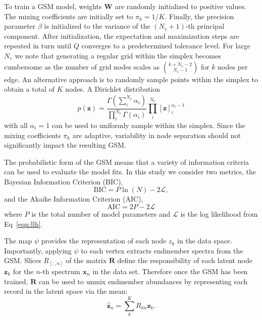 To train a GSM model, weights $\mathbf{W}$ are randomly initialized to positive
values. The mixing coefficients are initially set to $\pi_k = 1/K$. Finally, the
precision parameter $\beta$ is initialized to the variance of the $(N_v+1)$-th
principal component. After initialization, the expectation and maximization
steps are repeated in turn until $Q$ converges to a predetermined tolerance
level. For large $N_v$ we note that generating a regular grid within the simplex
becomes cumbersome as the number of grid nodes scales as ${k + N_v - 2 \choose
  N_v - 1}$ for $k$ nodes per edge. An alternative approach is to randomly
sample points within the simplex to obtain a total of $K$ nodes. A Dirichlet
distribution
\begin{equation}
    p(\mathbf{z}) = \frac{\Gamma(\sum_i^{N_v}\alpha_i)}{\prod_{i}^{N_v}\Gamma(\alpha_i)} \prod_{i}^{N_v} [\mathbf{z}]_i^{\alpha_i-1}
\end{equation}
with all $\alpha_i=1$ can be used to uniformly sample within the simplex. Since
the mixing coefficients $\pi_k$ are adaptive, variability in node separation
should not significantly impact the resulting GSM.

The probabilistic form of the GSM means that a variety of information criteria
can be used to evaluate the model fits. In this study we consider two metrics,
the Bayesian Information Criterion (BIC),
\begin{equation}
   \text{BIC} = P\ln(N) - 2\mathscr{L},
\end{equation}
and the Akaike Information Criterion (AIC),
\begin{equation}
    \text{AIC} = 2P - 2\mathscr{L}
\end{equation}
where $P$ is the total number of model parameters and $\mathscr{L}$ is the log
likelihood from Eq~\ref{eqn:llh}.

The map $\psi$ provides the representation of each node $z_k$ in the data space.
Importantly, applying $\psi$ to each vertex extracts endmember spectra from the
GSM. Slices $R_{\left[:,n\right]}$ of the matrix $\mathbf{R}$ define the
responsibility of each latent node $\mathbf{z}_k$ for the $n$-th spectrum
$\mathbf{x}_n$ in the data set. Therefore once the GSM has been trained,
$\mathbf{R}$ can be used to unmix endmember abundances by representing each
record in the latent space via the mean:
\begin{equation}
    \hat{\mathbf{z}}_n = \sum_k^K R_{kn}\mathbf{z}_k.
\end{equation}

